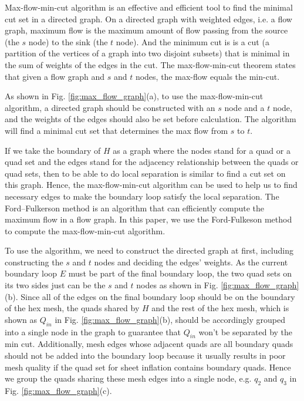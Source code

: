 \documentclass[final,5p,times,twocolumn]{elsarticle}
\begin{document}
Max-flow-min-cut algorithm is an effective and efficient tool to find the minimal cut set in a directed graph\cite{lawler20014}. On a directed graph with weighted edges, i.e. a flow graph, maximum flow is the maximum amount of flow passing from the source (the $s$ node) to the sink (the $t$ node). And the minimum cut is is a cut (a partition of the vertices of a graph into two disjoint subsets) that is minimal in the sum of weights of the edges in the cut. The max-flow-min-cut theorem states that given a flow graph and $s$ and $t$ nodes, the max-flow equals the min-cut.

As shown in Fig. \ref{fig:max_flow_graph}(a), to use the max-flow-min-cut algorithm, a directed graph should be constructed with an $s$ node and a $t$ node, and the weights of the edges should also be set before calculation. The algorithm will find a minimal cut set that determines the max flow from $s$ to $t$.

If we take the boundary of $H$ as a graph where the nodes stand for a quad or a quad set and the edges stand for the adjacency relationship between the quads or quad sets, then to be able to do local separation is similar to find a cut set on this graph. Hence, the max-flow-min-cut algorithm can be used to help us to find necessary edges to make the boundary loop satisfy the local separation. The Ford–Fulkerson method is an algorithm that can efficiently compute the maximum flow in a flow graph\cite{ford1956maximal}. In this paper, we use the Ford-Fulkeson method to compute the max-flow-min-cut algorithm.

To use the algorithm, we need to construct the directed graph at first, including constructing the $s$ and $t$ nodes and deciding the edges' weights. As the current boundary loop $E$ must be part of the final boundary loop, the two quad sets on its two sides just can be the $s$ and $t$ nodes as shown in Fig. \ref{fig:max_flow_graph}(b). Since all of the edges on the final boundary loop should be on the boundary of the hex mesh, the quads shared by $H$ and the rest of the hex mesh, which is shown as $Q_{in}$ in Fig. \ref{fig:max_flow_graph}(b), should be accordingly grouped into a single node in the graph to guarantee that $Q_{in}$ won't be separated by the min cut. Additionally, mesh edges whose adjacent quads are all boundary quads should not be added into the boundary loop because it usually results in poor mesh quality if the quad set for sheet inflation contains boundary quads. Hence we group the quads sharing these mesh edges into a single node, e.g. $q_2$ and $q_3$ in Fig. \ref{fig:max_flow_graph}(c).
\end{document}

